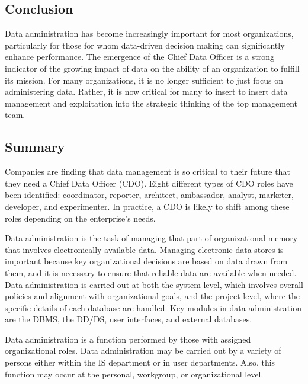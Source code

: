 \documentclass[
]{article}
\begin{document}
\hypertarget{conclusion-6}{%
\subsection*{Conclusion}\label{conclusion-6}}

Data administration has become increasingly important for most
organizations, particularly for those for whom data-driven decision
making can significantly enhance performance. The emergence of the Chief
Data Officer is a strong indicator of the growing impact of data on the
ability of an organization to fulfill its mission. For many
organizations, it is no longer sufficient to just focus on administering
data. Rather, it is now critical for many to insert to insert data
management and exploitation into the strategic thinking of the top
management team.

\hypertarget{summary-16}{%
\subsection*{Summary}\label{summary-16}}

Companies are finding that data management is so critical to their
future that they need a Chief Data Officer (CDO). Eight different types
of CDO roles have been identified: coordinator, reporter, architect,
ambassador, analyst, marketer, developer, and experimenter. In practice,
a CDO is likely to shift among these roles depending on the enterprise's
needs.

Data administration is the task of managing that part of organizational
memory that involves electronically available data. Managing electronic
data stores is important because key organizational decisions are based
on data drawn from them, and it is necessary to ensure that reliable
data are available when needed. Data administration is carried out at
both the system level, which involves overall policies and alignment
with organizational goals, and the project level, where the specific
details of each database are handled. Key modules in data administration
are the DBMS, the DD/DS, user interfaces, and external databases.

Data administration is a function performed by those with assigned
organizational roles. Data administration may be carried out by a
variety of persons either within the IS department or in user
departments. Also, this function may occur at the personal, workgroup,
or organizational level.
\end{document}
